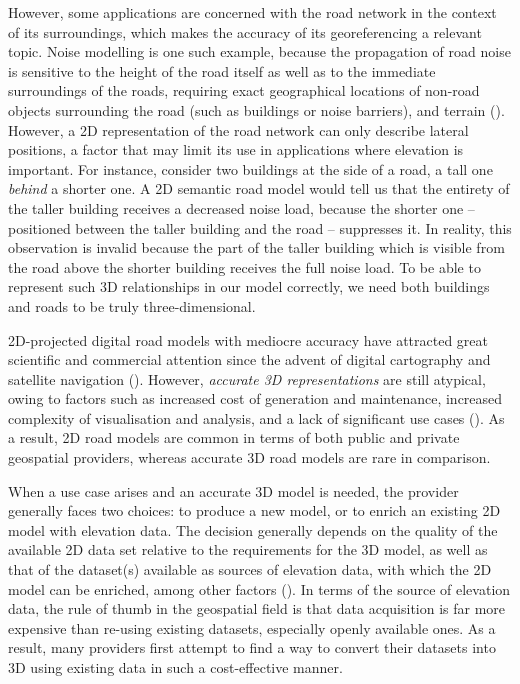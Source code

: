 However, some applications are concerned with the road network in the context of its surroundings, which makes the accuracy of its georeferencing a relevant topic. Noise modelling is one such example, because the propagation of road noise is sensitive to the height of the road itself as well as to the immediate surroundings of the roads, requiring exact geographical locations of non-road objects surrounding the road (such as buildings or noise barriers), and terrain (\cite{ishiyama_etal_1991, bennett_1997, guarnaccia_quartieri_2012}). However, a 2D representation of the road network can only describe lateral positions, a factor that may limit its use in applications where elevation is important. For instance, consider two buildings at the side of a road, a tall one \textit{behind} a shorter one. A 2D semantic road model would tell us that the entirety of the taller building receives a decreased noise load, because the shorter one – positioned between the taller building and the road – suppresses it. In reality, this observation is invalid because the part of the taller building which is visible from the road above the shorter building receives the full noise load. To be able to represent such 3D relationships in our model correctly, we need both buildings and roads to be truly three-dimensional.

2D-projected digital road models with mediocre accuracy have attracted great scientific and commercial attention since the advent of digital cartography and satellite navigation (\cite{taylor_etal_2001, fouque_bonnifait_2008, yue_etal_2008, chen_hsu_2020}). However, \textit{accurate 3D representations} are still atypical, owing to factors such as increased cost of generation and maintenance, increased complexity of visualisation and analysis, and a lack of significant use cases (\cite{zhu_li_2007, wang_etal_2014}). As a result, 2D road models are common in terms of both public and private geospatial providers, whereas accurate 3D road models are rare in comparison.

When a use case arises and an accurate 3D model is needed, the provider generally faces two choices: to produce a new model, or to enrich an existing 2D model with elevation data. The decision generally depends on the quality of the available 2D data set relative to the requirements for the 3D model, as well as that of the dataset(s) available as sources of elevation data, with which the 2D model can be enriched, among other factors (\cite{zhu_li_2007, zhu_li_2008, wang_etal_2014}). In terms of the source of elevation data, the rule of thumb in the geospatial field is that data acquisition is far more expensive than re-using existing datasets, especially openly available ones. As a result, many providers first attempt to find a way to convert their datasets into 3D using existing data in such a cost-effective manner.

